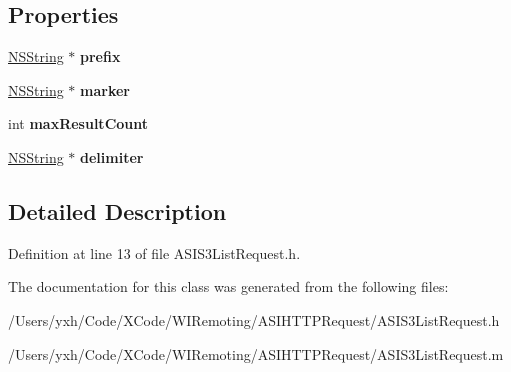 \subsection*{Properties}
\begin{DoxyCompactItemize}
\item 
\hypertarget{interface_a_s_i_s3_list_request_abe7d17f941097a7aa685cbf39b7988f1}{
\hyperlink{class_n_s_string}{NSString} $\ast$ {\bfseries prefix}}
\label{interface_a_s_i_s3_list_request_abe7d17f941097a7aa685cbf39b7988f1}

\item 
\hypertarget{interface_a_s_i_s3_list_request_a06f50af4f31ec73ee4940e6977a3b01b}{
\hyperlink{class_n_s_string}{NSString} $\ast$ {\bfseries marker}}
\label{interface_a_s_i_s3_list_request_a06f50af4f31ec73ee4940e6977a3b01b}

\item 
\hypertarget{interface_a_s_i_s3_list_request_af25224d46c7d6e7aff4e12f595cd14a4}{
int {\bfseries maxResultCount}}
\label{interface_a_s_i_s3_list_request_af25224d46c7d6e7aff4e12f595cd14a4}

\item 
\hypertarget{interface_a_s_i_s3_list_request_a95ab5d3eb6333887cabae95cf41d7781}{
\hyperlink{class_n_s_string}{NSString} $\ast$ {\bfseries delimiter}}
\label{interface_a_s_i_s3_list_request_a95ab5d3eb6333887cabae95cf41d7781}

\end{DoxyCompactItemize}


\subsection{Detailed Description}


Definition at line 13 of file ASIS3ListRequest.h.

The documentation for this class was generated from the following files:\begin{DoxyCompactItemize}
\item 
/Users/yxh/Code/XCode/WIRemoting/ASIHTTPRequest/ASIS3ListRequest.h\item 
/Users/yxh/Code/XCode/WIRemoting/ASIHTTPRequest/ASIS3ListRequest.m\end{DoxyCompactItemize}
